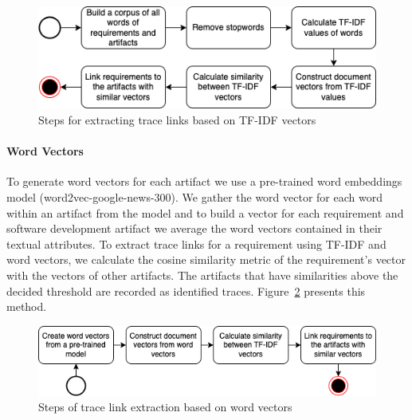       \begin{figure}[htb]
        \centering
        \includegraphics[width=0.99\linewidth]{figs/tfidfvector2.png}
        \caption{Steps for extracting trace links based on TF-IDF vectors}
        \label{fig:tfidfvec}
      \end{figure}

      \paragraph{Word Vectors} To generate word vectors for each artifact we use a pre-trained word embeddings model (word2vec-google-news-300). 
      We gather the word vector for each word within an artifact from the model and to build a vector for each requirement and software development artifact we average the word vectors contained in their textual attributes. 
      To extract trace links for a requirement using TF-IDF and word vectors, we calculate the cosine similarity metric of the requirement's vector with the vectors of other artifacts. 
      The artifacts that have similarities above the decided threshold are recorded as identified traces. 
      Figure~\ref{fig:wordvec} presents this method.

       \begin{figure}[htb]
        \centering
        \includegraphics[width=0.99\linewidth]{figs/wordvector.png}
        \caption{Steps of trace link extraction based on word vectors}
        \label{fig:wordvec}
      \end{figure}



